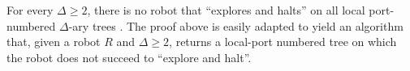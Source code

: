 
%
%
%
%

\begin{note}
For every $\Delta \geq 2$, there is no robot that ``explores and halts'' on all local port-numbered $\Delta$-ary trees \cite{Diks200438}.
The proof above is easily adapted to yield an algorithm that, given a robot $R$ and $\Delta \geq 2$, returns a local-port numbered tree on which the robot does not succeed to ``explore and halt''.
\end{note}


